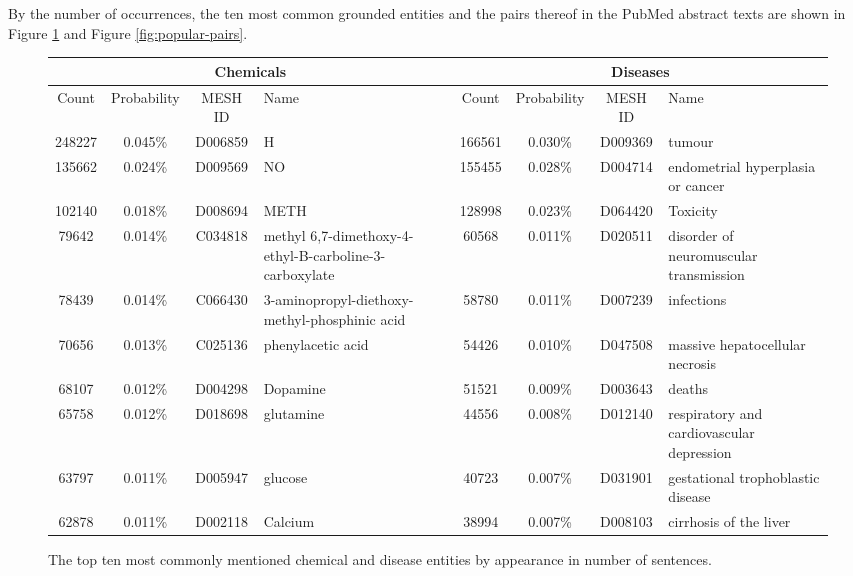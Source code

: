 \documentclass[10pt, oneside]{article}
\begin{document}
By the number of occurrences, the ten most common grounded entities and the pairs thereof in the PubMed abstract texts are shown in Figure \ref{fig:popular-individuals} and Figure \ref{fig:popular-pairs}.

\begin{figure}[h]
\begin{center}
\fontsize{9}{11}\selectfont
\begin{tabular}{|*{3}{c|}p{1.9cm}||*{3}{c|}p{1.9cm}|}\hline
\multicolumn{4}{|c||}{\textbf{Chemicals}} & \multicolumn{4}{c|}{\textbf{Diseases}} \\ \hline 
Count & Probability & MESH ID & Name & Count & Probability & MESH ID & Name \\ \hline 
248227 & 0.045\% & D006859 & H & 166561 & 0.030\% & D009369 & tumour \\ \hline 
135662 & 0.024\% & D009569 & NO & 155455 & 0.028\% & D004714 & endometrial hyperplasia or cancer \\ \hline 
102140 & 0.018\% & D008694 & METH & 128998 & 0.023\% & D064420 & Toxicity \\ \hline 
79642 & 0.014\% & C034818 & methyl 6,7-dimethoxy-4-ethyl-B-carboline-3-carboxylate & 60568 & 0.011\% & D020511 & disorder of neuromuscular transmission \\ \hline 
78439 & 0.014\% & C066430 & 3-aminopropyl-diethoxy-methyl-phosphinic acid & 58780 & 0.011\% & D007239 & infections \\ \hline 
70656 & 0.013\% & C025136 & phenylacetic acid & 54426 & 0.010\% & D047508 & massive hepatocellular necrosis \\ \hline 
68107 & 0.012\% & D004298 & Dopamine & 51521& 0.009\% & D003643 & deaths \\ \hline 
65758 & 0.012\% & D018698 & glutamine & 44556 & 0.008\% & D012140 & respiratory and cardiovascular depression \\ \hline 
63797 & 0.011\% & D005947 & glucose & 40723 & 0.007\% & D031901 & gestational trophoblastic disease \\ \hline 
62878 & 0.011\% & D002118 & Calcium & 38994 & 0.007\% & D008103  & cirrhosis of the liver \\ \hline 
\end{tabular}
\caption{\label{fig:popular-individuals} The top ten most commonly mentioned chemical and disease entities by appearance in number of sentences.}
\end{center}
\end{figure}
\end{document}
